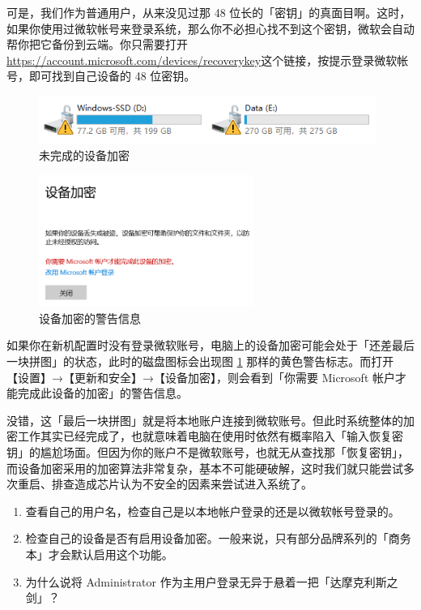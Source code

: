可是，我们作为普通用户，从来没见过那 48 位长的「密钥」的真面目啊。这时，如果你使用过微软帐号来登录系统，那么你不必担心找不到这个密钥，微软会自动帮你把它备份到云端。你只需要打开\url{https://account.microsoft.com/devices/recoverykey}这个链接，按提示登录微软帐号，即可找到自己设备的 48 位密钥。

\begin{figure}[htb!]
  \centering
  \includegraphics[width=11cm]{assets/Bitlocker_Unfinished.png}
  \caption{未完成的设备加密}
  \label{Bitlocker_Unfinished}
\end{figure}

\begin{figure}[htb!]
  \centering
  \includegraphics[width=7cm]{assets/Bitlocker_Info.png}
  \caption{设备加密的警告信息}
  \label{Bitlocker_Info}
\end{figure}

如果你在新机配置时没有登录微软账号，电脑上的设备加密可能会处于「还差最后一块拼图」的状态，此时的磁盘图标会出现图 \ref{Bitlocker_Unfinished} 那样的黄色警告标志。而打开【设置】→【更新和安全】→【设备加密】，则会看到「你需要 Microsoft 帐户才能完成此设备的加密」的警告信息。

没错，这「最后一块拼图」就是将本地账户连接到微软账号。但此时系统整体的加密工作其实已经完成了，也就意味着电脑在使用时依然有概率陷入「输入恢复密钥」的尴尬场面。但因为你的账户不是微软账号，也就无从查找那「恢复密钥」，而设备加密采用的加密算法非常复杂，基本不可能硬破解，这时我们就只能尝试多次重启、排查造成芯片认为不安全的因素来尝试进入系统了。


\practice

\begin{enumerate}
  \item 查看自己的用户名，检查自己是以本地帐户登录的还是以微软帐号登录的。
  \item 检查自己的设备是否有启用设备加密。一般来说，只有部分品牌系列的「商务本」才会默认启用这个功能。
  \item 为什么说将 Administrator 作为主用户登录无异于悬着一把「达摩克利斯之剑」？
\end{enumerate}
